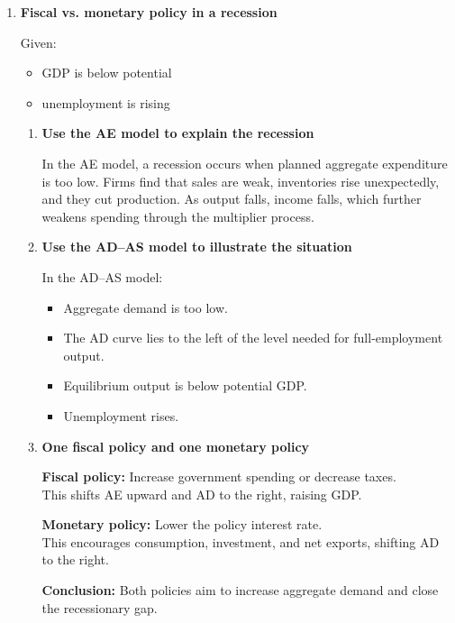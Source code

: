 \documentclass[12pt]{article}
\begin{document}
\begin{enumerate}[label=\textbf{\arabic*.}, start=18]

\item \textbf{Fiscal vs. monetary policy in a recession}

Given:
\begin{itemize}
    \item GDP is below potential
    \item unemployment is rising
\end{itemize}

\begin{enumerate}
    \item[(a)] \textbf{Use the AE model to explain the recession}

In the AE model, a recession occurs when planned aggregate expenditure is too low. Firms find that sales are weak, inventories rise unexpectedly, and they cut production. As output falls, income falls, which further weakens spending through the multiplier process.

\item[(b)] \textbf{Use the AD--AS model to illustrate the situation}

In the AD--AS model:
\begin{itemize}
    \item Aggregate demand is too low.
    \item The AD curve lies to the left of the level needed for full-employment output.
    \item Equilibrium output is below potential GDP.
    \item Unemployment rises.
\end{itemize}

\item[(c)] \textbf{One fiscal policy and one monetary policy}

\textbf{Fiscal policy:} Increase government spending or decrease taxes.\\
This shifts AE upward and AD to the right, raising GDP.

\textbf{Monetary policy:} Lower the policy interest rate.\\
This encourages consumption, investment, and net exports, shifting AD to the right.

\textbf{Conclusion:} Both policies aim to increase aggregate demand and close the recessionary gap.
\end{enumerate}

\end{enumerate}
\end{document}
